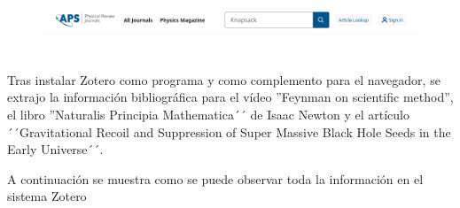 \documentclass[12pt]{exam}
\begin{document}
\begin{figure}[H]
    \centering
    \includegraphics[width=0.8\linewidth]{Figures/section_2_b_p3.png}
    \label{fig:sec_2_b_p3}
\end{figure}

\section{}

Tras instalar Zotero como programa y como complemento para el navegador, se extrajo la información bibliográfica para el vídeo ''Feynman on scientific method'', el libro ''Naturalis Principia Mathematica´´ de Isaac Newton y el artículo ´´Gravitational Recoil and Suppression of Super Massive Black Hole Seeds in the Early Universe´´.

A continuación se muestra como se puede observar toda la información en el sistema Zotero
\end{document}
